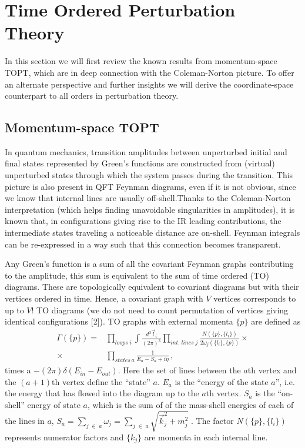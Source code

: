 \documentclass[%
 reprint,
 amsmath,amssymb,
 aps,
]{revtex4-1}
\begin{document}
\section{Time Ordered Perturbation Theory}
In this section we will first review the known results from momentum-space TOPT, which are in deep connection with the Coleman-Norton picture. To offer an alternate perspective and further insights we will derive the coordinate-space counterpart to all orders in perturbation theory. 

\subsection{Momentum-space TOPT}

In quantum mechanics, transition amplitudes between unperturbed initial and final states represented by Green's functions are constructed from (virtual) unperturbed states through which the system passes during the transition. This picture is also present in QFT Feynman diagrams, even if it is not obvious, since we know that internal lines are usually off-shell.Thanks to the Coleman-Norton interpretation \cite{ColNor} (which helps finding unavoidable singularities in amplitudes), it is known that, in configurations giving rise to the IR leading contributions, the intermediate states traveling a noticeable distance are on-shell. Feynman integrals can be re-expressed in a way such that this connection becomes transparent.\par
   
        Any Green's function is a sum of all the covariant Feynman graphs contributing to the amplitude, this sum is equivalent to the sum of time ordered (TO) diagrams. These are topologically equivalent to covariant diagrams but with their vertices ordered in time. Hence, a covariant graph with $V$ vertices corresponds to up to $V!$ TO diagrams (we do not need to count permutation of vertices giving identical configurations [2]). TO graphs with external momenta $\{p\}$ are defined as
\begin{align}
\Gamma(\{p\})=&\prod_{loops\;i}\int\frac{d^3\vec{l}_i}{(2\pi)^3}\prod_{int.\;lines\;j}\frac{N(\{p\},\{l_i\})}{2\omega_j(\{l_i\},\{p\})}\times\nonumber\\
\times&\prod_{states\,a}\frac{1}{E_a-S_a+i\eta}\label{TOdiag}\,,
\end{align}
times a $-(2\pi)\delta(E_{in}-E_{out})$. Here the set of lines between the $a$th vertex and the $(a+1)$th vertex define the ``state'' $a$. $E_a$ is the ``energy of the state $a$'', i.e. the energy that has flowed into the diagram up to the $a$th vertex. $S_a$ is the ``on-shell'' energy of state $a$, which is the sum of of the mass-shell energies of each of the lines in $a$, $
S_a=\sum_{j\;\in \;a}\omega_j=\sum_{j\;\in\;a}\sqrt{\vec{k}_j^2+m_j^2}\;.$
The factor $N(\{p\},\{l_i\})$ represents numerator factors and $\{k_j\}$ are momenta in each internal line. \\
\end{document}
